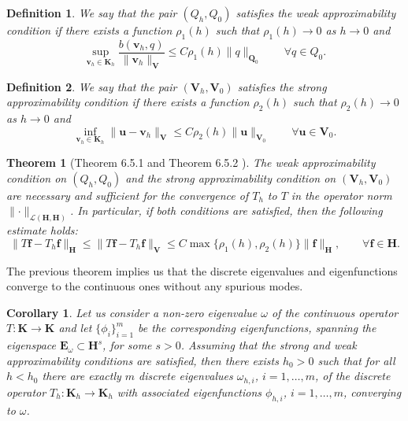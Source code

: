 \documentclass[USenglish]{article}
\theoremstyle{dgthm}
\newtheorem{theorem}{Theorem}
\newtheorem{corollary}{Corollary}
\theoremstyle{dgdef}
\newtheorem{definition}{Definition}
\let\vec\bm
\newcommand\norm[1]{\lVert#1\rVert}
\begin{document}
\begin{definition}
  We say that the pair $(Q_h,Q_0)$ satisfies the weak approximability condition if there exists a function $\rho_1(h)$ such that $\rho_1(h)\to 0$ as $h\to 0$ and
  \begin{equation}
    \underset{\vec{v}_h\in \vec{K}_h}{\sup} \frac{b(\vec{v}_h,q)}{\norm{\vec{v}_h}_{\vec{V}}} \leq C \rho_1(h)\norm{q}_{\vec{Q}_0} \qquad \forall q\in Q_0.
  \end{equation}
\end{definition}
\begin{definition}
  We say that the pair $(\vec{V}_h,\vec{V}_0)$ satisfies the strong approximability condition if there exists a function $\rho_2(h)$ such that $\rho_2(h)\to 0$ as $h\to 0$ and
  \begin{equation}
    \label{eq:weakApprox}
    \underset{\vec{v}_h\in \vec{K}_h}{\inf} \norm{\vec{u}-\vec{v}_h}_{\vec{V}} \leq C \rho_2(h)\norm{\vec{u}}_{\vec{V}_0} \qquad \forall \vec{u}\in \vec{V}_0.
  \end{equation}
\end{definition}
\begin{theorem}[Theorem 6.5.1 and Theorem 6.5.2 \cite{BBF}]
  \label{thm:BGG}
  The weak approximability condition on $(Q_h,Q_0)$ and the strong approximability condition on $(\vec{V}_h,\vec{V}_0)$ are necessary and sufficient for the convergence of $T_h$ to $T$ in the operator norm $\norm{\cdot}_{\mathcal{L}(\vec{H},\vec{H})}$.
  In particular, if both conditions are satisfied, then the following estimate holds:
  \begin{equation}
    \norm{T\vec{f}-T_h\vec{f}}_{\vec{H}}\leq \norm{T\vec{f}-T_h\vec{f}}_{\vec{V}}\leq C \max\{\rho_1(h),\rho_2(h)\}\norm{\vec{f}}_{\vec{H}}, \qquad \forall \vec{f}\in \vec{H}.
  \end{equation}
\end{theorem}
The previous theorem implies us that the discrete eigenvalues and eigenfunctions converge to the continuous ones without any spurious modes.
\begin{corollary}
  Let us consider a non-zero eigenvalue $\omega$ of the continuous operator $T:\vec{K}\to\vec{K}$ and let $\{\phi_i\}_{i=1}^{m}$ be the corresponding eigenfunctions, spanning the eigenspace $\vec{E}_\omega\subset \vec{H}^s$, for some $s>0$.
  Assuming that the strong and weak approximability conditions are satisfied, then there exists $h_0>0$ such that for all $h<h_0$ there are exactly $m$ discrete eigenvalues $\omega_{h,i}$, $i=1,\ldots,m$, of the discrete operator $T_h:\vec{K}_h\to \vec{K}_h$ with associated eigenfunctions $\phi_{h,i}$, $i=1,\ldots,m$, converging to $\omega$.
\end{corollary}
\end{document}
